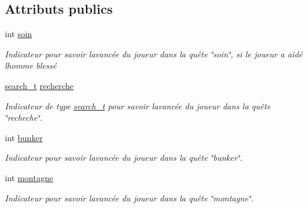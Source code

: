 \subsection*{Attributs publics}
\begin{DoxyCompactItemize}
\item 
\mbox{\label{structquete__t_a400ce45a6acc4633289e352e65940e43}} 
int \hyperlink{structquete__t_a400ce45a6acc4633289e352e65940e43}{soin}
\begin{DoxyCompactList}\small\item\em Indicateur pour savoir l\textquotesingle{}avancée du joueur dans la quête \char`\"{}soin\char`\"{}, si le joueur a aidé l\textquotesingle{}homme blessé \end{DoxyCompactList}\item 
\mbox{\label{structquete__t_afa01c2d7f63f97e980a9881cc66789b0}} 
\hyperlink{structsearch__t}{search\+\_\+t} \hyperlink{structquete__t_afa01c2d7f63f97e980a9881cc66789b0}{recherche}
\begin{DoxyCompactList}\small\item\em Indicateur de type \hyperlink{structsearch__t}{search\+\_\+t} pour savoir l\textquotesingle{}avancée du joueur dans la quête \char`\"{}recheche\char`\"{}. \end{DoxyCompactList}\item 
\mbox{\label{structquete__t_a8d0b29d5041dd3a5e16bd1a61bd739fd}} 
int \hyperlink{structquete__t_a8d0b29d5041dd3a5e16bd1a61bd739fd}{bunker}
\begin{DoxyCompactList}\small\item\em Indicateur pour savoir l\textquotesingle{}avancée du joueur dans la quête \char`\"{}bunker\char`\"{}. \end{DoxyCompactList}\item 
\mbox{\label{structquete__t_a5460a0036fa3d7ee2be1709ad0aa983f}} 
int \hyperlink{structquete__t_a5460a0036fa3d7ee2be1709ad0aa983f}{montagne}
\begin{DoxyCompactList}\small\item\em Indicateur pour savoir l\textquotesingle{}avancée du joueur dans la quête \char`\"{}montagne\char`\"{}. \end{DoxyCompactList}\item 
\mbox{\label{structquete__t_aa868cfb9c0666dedb9ba8626a08b9286}} 

\end{DoxyCompactItemize}
